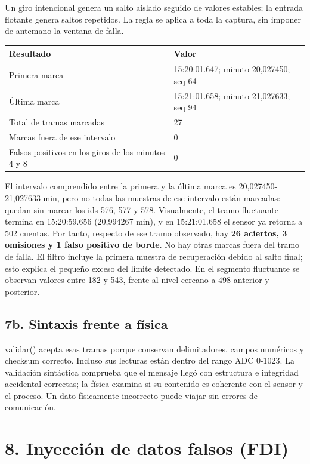 \documentclass[
  11pt,
]{article}
\begin{document}
Un giro intencional genera un salto aislado seguido de valores estables;
la entrada flotante genera saltos repetidos. La regla se aplica a toda
la captura, sin imponer de antemano la ventana de falla.

\Needspace{4.5cm}
\begin{longtable}[]{@{}ll@{}}
\toprule\noalign{}
Resultado & Valor \\
\midrule\noalign{}
\endhead
\bottomrule\noalign{}
\endlastfoot
Primera marca & 15:20:01.647; minuto 20,027450; seq 64 \\
Última marca & 15:21:01.658; minuto 21,027633; seq 94 \\
Total de tramas marcadas & 27 \\
Marcas fuera de ese intervalo & 0 \\
Falsos positivos en los giros de los minutos 4 y 8 & 0 \\
\end{longtable}

El intervalo comprendido entre la primera y la última marca es
20,027450-21,027633 min, pero no todas las muestras de ese intervalo
están marcadas: quedan sin marcar los ids 576, 577 y 578. Visualmente,
el tramo fluctuante termina en 15:20:59.656 (20,994267 min), y en
15:21:01.658 el sensor ya retorna a 502 cuentas. Por tanto, respecto de
ese tramo observado, hay \textbf{26 aciertos, 3 omisiones y 1 falso
positivo de borde}. No hay otras marcas fuera del tramo de falla. El
filtro incluye la primera muestra de recuperación debido al salto final;
esto explica el pequeño exceso del límite detectado. En el segmento
fluctuante se observan valores entre 182 y 543, frente al nivel cercano
a 498 anterior y posterior.

\hypertarget{b.-sintaxis-frente-a-fuxedsica}{%
\subsection{7b. Sintaxis frente a
física}\label{b.-sintaxis-frente-a-fuxedsica}}

validar() acepta esas tramas porque conservan delimitadores, campos
numéricos y checksum correcto. Incluso sus lecturas están dentro del
rango ADC 0-1023. La validación sintáctica comprueba que el mensaje
llegó con estructura e integridad accidental correctas; la física
examina si su contenido es coherente con el sensor y el proceso. Un dato
físicamente incorrecto puede viajar sin errores de comunicación.

\hypertarget{inyecciuxf3n-de-datos-falsos-fdi}{%
\section{8. Inyección de datos falsos
(FDI)}\label{inyecciuxf3n-de-datos-falsos-fdi}}
\end{document}
